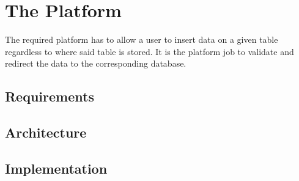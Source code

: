 \chapter{The Platform}

The required platform has to allow a user to insert data on a given table regardless to where said table is stored. 
It is the platform job to validate and redirect the data to the corresponding database.


\section{Requirements}
\section{Architecture}
\section{Implementation}
